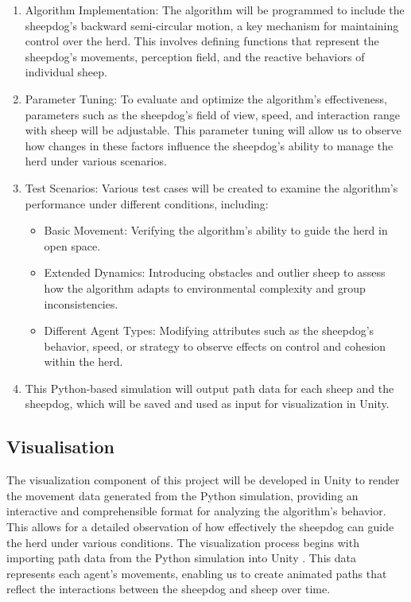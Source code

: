 \documentclass[9pt]{pnas-new}
\begin{document}
\begin{enumerate}
    \item Algorithm Implementation: The algorithm will be programmed to include the sheepdog’s backward semi-circular motion, a key mechanism for maintaining control over the herd. This involves defining functions that represent the sheepdog’s movements, perception field, and the reactive behaviors of individual sheep.
    \item Parameter Tuning: To evaluate and optimize the algorithm’s effectiveness, parameters such as the sheepdog’s field of view, speed, and interaction range with sheep will be adjustable. This parameter tuning will allow us to observe how changes in these factors influence the sheepdog’s ability to manage the herd under various scenarios.
    \item Test Scenarios: Various test cases will be created to examine the algorithm’s performance under different conditions, including:
    \begin{itemize}
        \item Basic Movement: Verifying the algorithm’s ability to guide the herd in open space.
        \item Extended Dynamics: Introducing obstacles and outlier sheep to assess how the algorithm adapts to environmental complexity and group inconsistencies.
        \item Different Agent Types: Modifying attributes such as the sheepdog’s behavior, speed, or strategy to observe effects on control and cohesion within the herd.
    \end{itemize}
    \item This Python-based simulation will output path data for each sheep and the sheepdog, which will be saved and used as input for visualization in Unity.
\end{enumerate}

\subsection*{Visualisation}
The visualization component of this project will be developed in Unity to render the movement data generated from the Python simulation, providing an interactive and comprehensible format for analyzing the algorithm's behavior. This allows for a detailed observation of how effectively the sheepdog can guide the herd under various conditions. The visualization process begins with importing path data from the Python simulation into Unity %
. This data represents each agent's movements, enabling us to create animated paths that reflect the interactions between the sheepdog and sheep over time.
\end{document}
